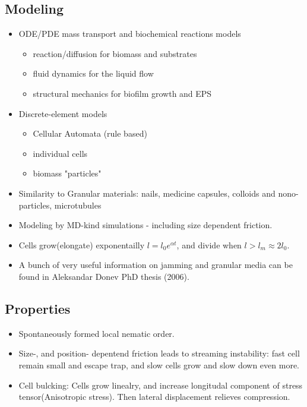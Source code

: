 \documentclass[10pt,a4paper]{article}
\begin{document}
\subsection{Modeling}
\begin{itemize}
 \item ODE/PDE mass transport and biochemical reactions models
 \begin{itemize}
  \item reaction/diffusion for biomass and substrates
  \item fluid dynamics for the liquid flow
  \item structural mechanics for biofilm growth and EPS
 \end{itemize}
 \item Discrete-element models
  \begin{itemize}
  \item Cellular Automata (rule based)
  \item individual cells
  \item biomass "particles"
 \end{itemize}
 \item Similarity to Granular materials: nails, medicine capsules, colloids and nono-particles, microtubules
 \item Modeling by MD-kind simulations - including size dependent friction.
 \item Cells grow(elongate) exponentailly $ l = l_0 e^{\alpha t}$, and divide when $l > l_m \approx 2l_0$.
 \item A bunch of very useful information on jamming and granular media can be found in Aleksandar Donev PhD thesis (2006).
\end{itemize}

\subsection{Properties}
\begin{itemize}
 \item Spontaneously formed local nematic order.
 \item Size-, and position- depentend friction leads to streaming instability: fast cell remain small and escape trap, and slow cells grow and slow down even more.
 \item Cell bulcking: Cells grow linealry, and increase longitudal component of stress tensor(Anisotropic stress). 
 Then lateral displacement relieves compression.
\end{itemize}
\end{document}
